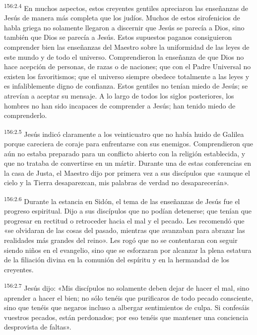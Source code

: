 \par 
\textsuperscript{156:2.4} En muchos aspectos, estos creyentes gentiles apreciaron las enseñanzas de Jesús de manera más completa que los judíos. Muchos de estos sirofenicios de habla griega no solamente llegaron a discernir que Jesús se parecía a Dios, sino también que Dios se parecía a Jesús. Estos supuestos paganos consiguieron comprender bien las enseñanzas del Maestro sobre la uniformidad de las leyes de este mundo y de todo el universo. Comprendieron la enseñanza de que Dios no hace acepción de personas, de razas o de naciones; que con el Padre Universal no existen los favoritismos; que el universo siempre obedece totalmente a las leyes y es infaliblemente digno de confianza. Estos gentiles no tenían miedo de Jesús; se atrevían a aceptar su mensaje. A lo largo de todos los siglos posteriores, los hombres no han sido incapaces de comprender a Jesús; han tenido miedo de comprenderlo.

\par 
\textsuperscript{156:2.5} Jesús indicó claramente a los veinticuatro que no había huido de Galilea porque careciera de coraje para enfrentarse con sus enemigos. Comprendieron que aún no estaba preparado para un conflicto abierto con la religión establecida, y que no trataba de convertirse en un mártir. Durante una de estas conferencias en la casa de Justa, el Maestro dijo por primera vez a sus discípulos que «aunque el cielo y la Tierra desaparezcan, mis palabras de verdad no desaparecerán».

\par 
\textsuperscript{156:2.6} Durante la estancia en Sidón, el tema de las enseñanzas de Jesús fue el progreso espiritual. Dijo a sus discípulos que no podían detenerse; que tenían que progresar en rectitud o retroceder hacia el mal y el pecado. Les recomendó que «se olvidaran de las cosas del pasado, mientras que avanzaban para abrazar las realidades más grandes del reino». Les rogó que no se contentaran con seguir siendo niños en el evangelio, sino que se esforzaran por alcanzar la plena estatura de la filiación divina en la comunión del espíritu y en la hermandad de los creyentes.

\par 
\textsuperscript{156:2.7} Jesús dijo: «Mis discípulos no solamente deben dejar de hacer el mal, sino aprender a hacer el bien; no sólo tenéis que purificaros de todo pecado consciente, sino que tenéis que negaros incluso a albergar sentimientos de culpa. Si confesáis vuestros pecados, están perdonados; por eso tenéis que mantener una conciencia desprovista de faltas».

